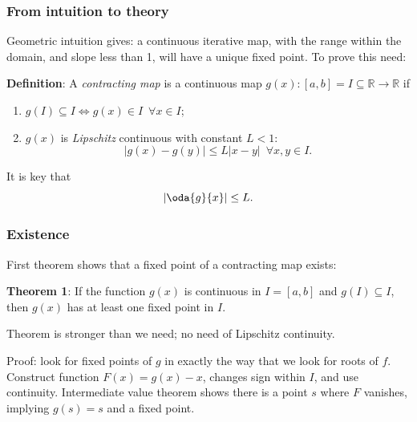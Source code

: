 \documentclass{beamer}
\begin{document}
\begin{frame}
  \frametitle{From intuition to theory}

  Geometric intuition gives: a continuous iterative map, with the
  range within the domain, and slope less than 1, will have a unique
  fixed point. \pause To prove this need:

  \vspace{1ex}

  {\bf Definition}: A \emph{contracting map} is a continuous map
  $g(x) : [a, b] = I \subseteq \mathbb{R} \rightarrow \mathbb{R}$ if
  \begin{enumerate}
  \item $g(I) \subseteq I \Leftrightarrow g(x) \in I \, \, \, \forall
    x \in I$; \pause
  \item $g(x)$ is \emph{Lipschitz} continuous with constant $L < 1$:
    \begin{equation*}
      | g(x) - g(y) | \leq L | x - y | \, \, \, \forall x, y \in I.
    \end{equation*}
  \end{enumerate} \pause

  \vspace{1ex}

  It is key that
  \begin{equation*}
    \left| \oda{g}{x} \right| \leq L.
  \end{equation*}

\end{frame}

\begin{frame}
  \frametitle{Existence}

  First theorem shows that a fixed point of a contracting map
  exists:

  \vspace{1ex}

  {\bf Theorem 1}: If the function $g(x)$ is continuous in $I = [a,
  b]$ and $g(I) \subseteq I$, then $g(x)$ has at least one fixed point
  in $I$. \pause

  \vspace{1ex}

  Theorem is stronger than we need; no need of Lipschitz continuity. \pause

  \vspace{1ex}

  Proof: look for fixed points of $g$ in exactly
  the way that we look for roots of $f$. Construct function $F(x) =
  g(x) - x$, changes sign within $I$, and use continuity.  Intermediate value theorem shows there is a point $s$ where $F$ vanishes, implying $g(s) = s$ and a fixed point.

\end{frame}
\end{document}

